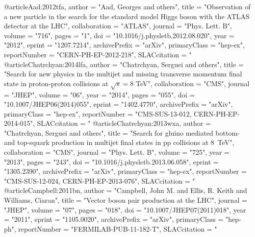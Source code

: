 @article{Aad:2012tfa,
      author         = "Aad, Georges and others",
      title          = "{Observation of a new particle in the search for the
                        standard model Higgs boson with the {ATLAS} detector at the
                        {LHC}}",
      collaboration  = "ATLAS",
      journal        = "Phys. Lett. B",
      volume         = "716",
      pages          = "1",
      doi            = "10.1016/j.physletb.2012.08.020",
      year           = "2012",
      eprint         = "1207.7214",
      archivePrefix  = "arXiv",
      primaryClass   = "hep-ex",
      reportNumber   = "CERN-PH-EP-2012-218",
      SLACcitation   = "%
}
@article{Chatrchyan:2014lfa,
      author         = "Chatrchyan, Serguei and others",
      title          = "{Search for new physics in the multijet and missing
                        transverse momentum final state in proton-proton
                        collisions at $\sqrt{s}= 8$ TeV}",
      collaboration  = "CMS",
      journal        = "JHEP",
      volume         = "06",
      year           = "2014",
      pages          = "055",
      doi            = "10.1007/JHEP06(2014)055",
      eprint         = "1402.4770",
      archivePrefix  = "arXiv",
      primaryClass   = "hep-ex",
      reportNumber   = "CMS-SUS-13-012, CERN-PH-EP-2014-015",
      SLACcitation   = "%
}
@article{Chatrchyan:2013wxa,
      author         = "Chatrchyan, Serguei and others",
      title          = "{Search for gluino mediated bottom- and top-squark
                        production in multijet final states in pp collisions at 8~TeV}",
      collaboration  = "CMS",
      journal        = "Phys. Lett. B",
      volume         = "725",
      year           = "2013",
      pages          = "243",
      doi            = "10.1016/j.physletb.2013.06.058",
      eprint         = "1305.2390",
      archivePrefix  = "arXiv",
      primaryClass   = "hep-ex",
      reportNumber   = "CMS-SUS-12-024, CERN-PH-EP-2013-076",
      SLACcitation   = "%
}
@article{Campbell:2011bn,
      author         = "Campbell, John M. and Ellis, R. Keith and Williams,
                        Ciaran",
      title          = "{Vector boson pair production at the {LHC}}",
      journal        = "JHEP",
      volume         = "07",
      pages          = "018",
      doi            = "10.1007/JHEP07(2011)018",
      year           = "2011",
      eprint         = "1105.0020",
      archivePrefix  = "arXiv",
      primaryClass   = "hep-ph",
      reportNumber   = "FERMILAB-PUB-11-182-T",
      SLACcitation   = "%
}
